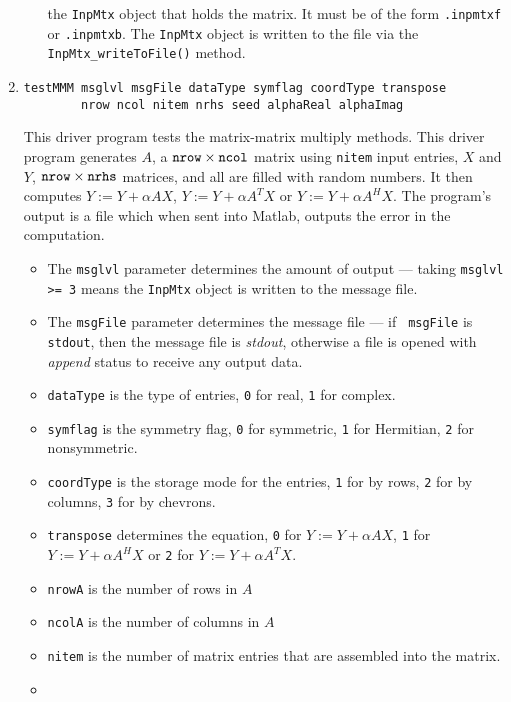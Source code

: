 \begin{enumerate}
\begin{itemize}
the {\tt InpMtx} object that holds the matrix.
It must be of the form {\tt *.inpmtxf} or {\tt *.inpmtxb}.
The {\tt InpMtx} object is written to the file via the
{\tt InpMtx\_writeToFile()} method.
\end{itemize}
\item
\begin{verbatim}
testMMM msglvl msgFile dataType symflag coordType transpose
        nrow ncol nitem nrhs seed alphaReal alphaImag
\end{verbatim}
This driver program tests the matrix-matrix multiply methods.
This driver program generates $A$, a 
${\tt nrow} \times {\tt ncol}$
matrix using {\tt nitem} input entries, $X$ and $Y$,
${\tt nrow} \times {\tt nrhs}$ matrices,
and all are filled with random numbers.
It then computes 
$Y := Y + \alpha A X$, 
$Y := Y + \alpha A^T X$ or
$Y := Y + \alpha A^H X$.
The program's output is a file which when sent into Matlab,
outputs the error in the computation.
\par
\begin{itemize}
\item
The {\tt msglvl} parameter determines the amount of output ---
taking {\tt msglvl >= 3} means the {\tt InpMtx} object is written
to the message file.
\item
The {\tt msgFile} parameter determines the message file --- if {\tt
msgFile} is {\tt stdout}, then the message file is {\it stdout},
otherwise a file is opened with {\it append} status to receive any
output data.
\item
{\tt dataType} is the type of entries,
{\tt 0} for real, {\tt 1} for complex.
\item
{\tt symflag} is the symmetry flag, {\tt 0} for symmetric, 
{\tt 1} for Hermitian, {\tt 2} for nonsymmetric.
\item
{\tt coordType} is the storage mode for the entries, 
{\tt 1} for by rows, {\tt 2} for by columns, 
{\tt 3} for by chevrons. 
\item
{\tt transpose} determines the equation,
{\tt 0} for $Y := Y + \alpha A X$, 
{\tt 1} for $Y := Y + \alpha A^H X$ or
{\tt 2} for $Y := Y + \alpha A^T X$.
\item
{\tt nrowA} is the number of rows in $A$
\item
{\tt ncolA} is the number of columns in $A$
\item
{\tt nitem} is the number of matrix entries that are 
assembled into the matrix.
\item

\end{itemize}
\end{enumerate}
